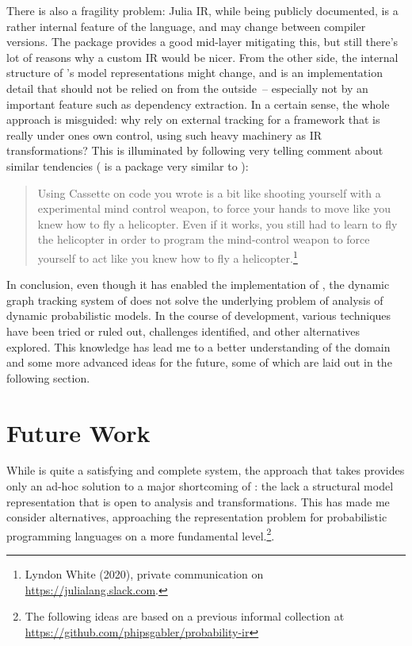 There is also a fragility problem: Julia IR, while being publicly documented, is a rather internal
feature of the language, and may change between compiler versions.  The 
package provides a good mid-layer mitigating this, but still there's lot of reasons why a custom IR
would be nicer.  From the other side, the internal structure of \dppljl{}'s model representations
might change, and is an implementation detail that should not be relied on from the outside~--
especially not by an important feature such as dependency extraction.  In a certain sense, the whole
approach is misguided: why rely on external tracking for a framework that is really under ones own
control, using such heavy machinery as IR transformations?  This is illuminated by following very
telling comment about similar tendencies ( is a package very similar to
):
\begin{quote}
  Using Cassette on code you wrote is a bit like shooting yourself with a experimental mind control
  weapon, to force your hands to move like you knew how to fly a helicopter.  Even if it works, you
  still had to learn to fly the helicopter in order to program the mind-control weapon to force
  yourself to act like you knew how to fly a helicopter.\footnote{Lyndon White (2020), private
    communication on \protect\url{https://julialang.slack.com}.}
\end{quote}

In conclusion, even though it has enabled the implementation of \autogibbsjl{}, the dynamic graph
tracking system of \irtrackerjl{} does not solve the underlying problem of analysis of dynamic
probabilistic models.  In the course of development, various techniques have been tried or ruled
out, challenges identified, and other alternatives explored.  This knowledge has lead me to a better
understanding of the domain and some more advanced ideas for the future, some of which are laid out
in the following section.

\section{Future Work}
\label{sec:future-work}

While \irtrackerjl{} is quite a satisfying and complete system, the approach that \autogibbsjl{}
takes provides only an ad-hoc solution to a major shortcoming of \turingjl{}: the lack a structural
model representation that is open to analysis and transformations.  This has made me consider
alternatives, approaching the representation problem for probabilistic programming languages on a
more fundamental level.\footnote{The following ideas are based on a previous informal collection at
  \protect\url{https://github.com/phipsgabler/probability-ir}}.


